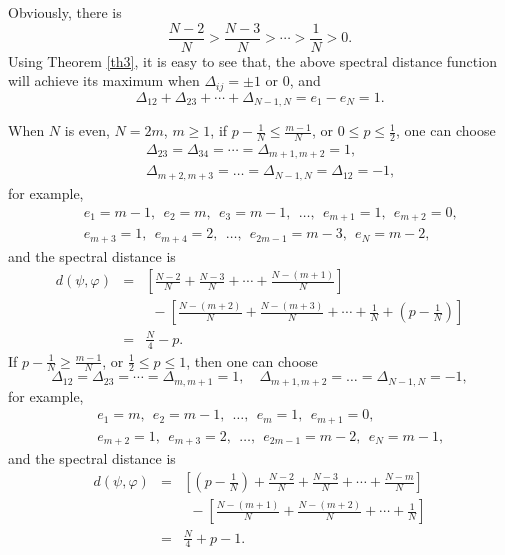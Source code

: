 \documentclass[a4paper,11pt]{article}
\begin{document}
Obviously, there is
\begin{equation}
\frac{N - 2}{N} > \frac{N - 3}{N} > \cdots > \frac{1}{N} > 0.
\end{equation}
Using Theorem \ref{th3}, it is easy to see that, the above spectral distance function will achieve its
maximum when $\Delta_{i j} = \pm 1$ or $0$, and
\begin{equation}
\Delta_{12} + \Delta_{23} + \cdots + \Delta_{N - 1, N} = e_1 - e_N = 1 .
\end{equation}


When $N$ is even, $N = 2 m$, $m \geqslant 1$, if $p - \frac{1}{N} \leqslant
\frac{m - 1}{N}$, or $0 \leqslant p \leqslant \frac{1}{2}$, one can choose
\begin{eqnarray}
&&\Delta_{23} = \Delta_{34} = \cdots = \Delta_{m + 1, m + 2} =
   1, \nonumber\\
&& \Delta_{m + 2, m + 3} = \ldots = \Delta_{N - 1,
   N} = \Delta_{12} = - 1,
\end{eqnarray}
for example,
\begin{eqnarray}
&&  e_1 = m - 1,~~ e_2 = m,~~ e_3 =m - 1,~~ \ldots,~~ e_{m + 1} = 1,~~ e_{m + 2} = 0,
\nonumber\\
&&  e_{m + 3} = 1,~~ e_{m + 4} = 2,~~ \ldots,~~ e_{2
  m - 1} = m - 3,~~ e_N = m - 2,
\end{eqnarray}
and the spectral distance is
\begin{eqnarray}
  d (\psi, \varphi) & = &  \left[ \frac{N - 2}{N} +
  \frac{N - 3}{N} + \cdots + \frac{N - (m + 1)}{N} \right] \nonumber\\
  &&~~ - \left[ \frac{N -
  (m + 2)}{N} + \frac{N - (m + 3)}{N} + \cdots + \frac{1}{N} + \left( p -
  \frac{1}{N} \right) \right] \nonumber\\
  & = & \frac{N}{4} - p .
\end{eqnarray}
If $p - \frac{1}{N} \geqslant \frac{m - 1}{N}$, or $\frac{1}{2} \leqslant p
\leqslant 1$, then one can choose
\begin{equation}
\Delta_{12} = \Delta_{23} = \cdots = \Delta_{m, m + 1} =
   1, \quad \Delta_{m + 1, m + 2} = \ldots = \Delta_{N - 1,
   N} = -1,
\end{equation}
for example,
\begin{eqnarray}
&&  e_1 = m,~~ e_2 = m-1,~~ \ldots,~~ e_m =
  1,~~ e_{m + 1} = 0,
\nonumber\\
&&  e_{m + 2} = 1,~~ e_{m + 3} = 2,~~ \ldots,~~ e_{2
  m - 1} = m-2,~~ e_N = m-1,
\end{eqnarray}
and the spectral distance is
\begin{eqnarray}
  d (\psi, \varphi) & = & \left[ \left( p -
  \frac{1}{N} \right) + \frac{N - 2}{N} + \frac{N - 3}{N} + \cdots + \frac{N -
  m}{N} \right]\nonumber\\
    &&~~- \left[ \frac{N - (m + 1)}{N} + \frac{N - (m + 2)}{N} +
  \cdots + \frac{1}{N}  \right]\nonumber\\
  & = & \frac{N}{4} + p - 1 .
\end{eqnarray}
\end{document}
